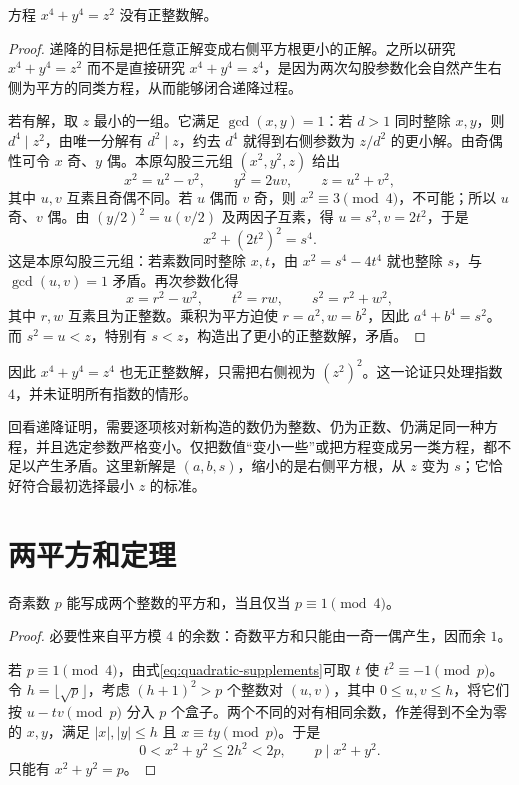 \begin{theorem}
\label{thm:fermat-four}
方程 $x^4+y^4=z^2$ 没有正整数解。
\end{theorem}
\begin{proof}
递降的目标是把任意正解变成右侧平方根更小的正解。之所以研究 $x^4+y^4=z^2$ 而不是直接研究 $x^4+y^4=z^4$，是因为两次勾股参数化会自然产生右侧为平方的同类方程，从而能够闭合递降过程。

若有解，取 $z$ 最小的一组。它满足 $\gcd(x,y)=1$：若 $d>1$ 同时整除 $x,y$，则 $d^4\mid z^2$，由唯一分解有 $d^2\mid z$，约去 $d^4$ 就得到右侧参数为 $z/d^2$ 的更小解。由奇偶性可令 $x$ 奇、$y$ 偶。本原勾股三元组 $(x^2,y^2,z)$ 给出
\[
 x^2=u^2-v^2,\qquad y^2=2uv,\qquad z=u^2+v^2,
\]
其中 $u,v$ 互素且奇偶不同。若 $u$ 偶而 $v$ 奇，则 $x^2\equiv3\pmod4$，不可能；所以 $u$ 奇、$v$ 偶。由 $(y/2)^2=u(v/2)$ 及两因子互素，得 $u=s^2,v=2t^2$，于是
\[
 x^2+(2t^2)^2=s^4.
\]
这是本原勾股三元组：若素数同时整除 $x,t$，由 $x^2=s^4-4t^4$ 就也整除 $s$，与 $\gcd(u,v)=1$ 矛盾。再次参数化得
\[
 x=r^2-w^2,\qquad t^2=rw,\qquad s^2=r^2+w^2,
\]
其中 $r,w$ 互素且为正整数。乘积为平方迫使 $r=a^2,w=b^2$，因此 $a^4+b^4=s^2$。而 $s^2=u<z$，特别有 $s<z$，构造出了更小的正整数解，矛盾。
\end{proof}

因此 $x^4+y^4=z^4$ 也无正整数解，只需把右侧视为 $(z^2)^2$。这一论证只处理指数 $4$，并未证明所有指数的情形。

回看递降证明，需要逐项核对新构造的数仍为整数、仍为正数、仍满足同一种方程，并且选定参数严格变小。仅把数值“变小一些”或把方程变成另一类方程，都不足以产生矛盾。这里新解是 $(a,b,s)$，缩小的是右侧平方根，从 $z$ 变为 $s$；它恰好符合最初选择最小 $z$ 的标准。

\section{两平方和定理}

\begin{lemma}
\label{lem:prime-two-squares}
奇素数 $p$ 能写成两个整数的平方和，当且仅当 $p\equiv1\pmod4$。
\end{lemma}
\begin{proof}
必要性来自平方模 $4$ 的余数：奇数平方和只能由一奇一偶产生，因而余 $1$。

若 $p\equiv1\pmod4$，由式\eqref{eq:quadratic-supplements}可取 $t$ 使 $t^2\equiv-1\pmod p$。令 $h=\lfloor\sqrt p\rfloor$，考虑 $(h+1)^2>p$ 个整数对 $(u,v)$，其中 $0\le u,v\le h$，将它们按 $u-tv\pmod p$ 分入 $p$ 个盒子。两个不同的对有相同余数，作差得到不全为零的 $x,y$，满足 $|x|,|y|\le h$ 且 $x\equiv ty\pmod p$。于是
\[
 0<x^2+y^2\le2h^2<2p,\qquad p\mid x^2+y^2.
\]
只能有 $x^2+y^2=p$。
\end{proof}

